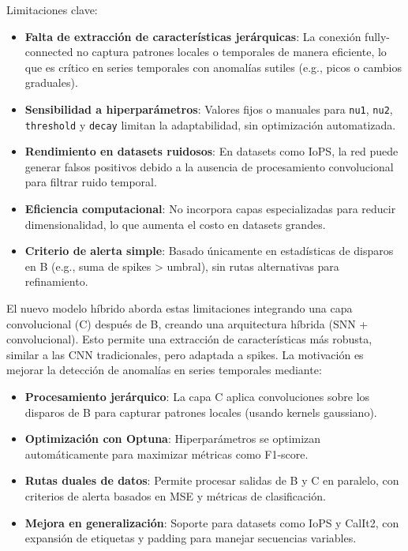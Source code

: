 Limitaciones clave:
\begin{itemize}
    \item \textbf{Falta de extracción de características jerárquicas}: La conexión fully-connected no captura patrones locales o temporales de manera eficiente, lo que es crítico en series temporales con anomalías sutiles (e.g., picos o cambios graduales).
    \item \textbf{Sensibilidad a hiperparámetros}: Valores fijos o manuales para \texttt{nu1}, \texttt{nu2}, \texttt{threshold} y \texttt{decay} limitan la adaptabilidad, sin optimización automatizada.
    \item \textbf{Rendimiento en datasets ruidosos}: En datasets como IoPS, la red puede generar falsos positivos debido a la ausencia de procesamiento convolucional para filtrar ruido temporal.
    \item \textbf{Eficiencia computacional}: No incorpora capas especializadas para reducir dimensionalidad, lo que aumenta el costo en datasets grandes.
    \item \textbf{Criterio de alerta simple}: Basado únicamente en estadísticas de disparos en B (e.g., suma de spikes > umbral), sin rutas alternativas para refinamiento.
\end{itemize}

El nuevo modelo híbrido aborda estas limitaciones integrando una capa convolucional (C) después de B, creando una arquitectura híbrida (SNN + convolucional). Esto permite una extracción de características más robusta, similar a las CNN tradicionales, pero adaptada a spikes. La motivación es mejorar la detección de anomalías en series temporales mediante:
\begin{itemize}
    \item \textbf{Procesamiento jerárquico}: La capa C aplica convoluciones sobre los disparos de B para capturar patrones locales (usando kernels gaussiano).
    \item \textbf{Optimización con Optuna}: Hiperparámetros se optimizan automáticamente para maximizar métricas como F1-score.
    \item \textbf{Rutas duales de datos}: Permite procesar salidas de B y C en paralelo, con criterios de alerta basados en MSE y métricas de clasificación.
    \item \textbf{Mejora en generalización}: Soporte para datasets como IoPS y CalIt2, con expansión de etiquetas y padding para manejar secuencias variables.
\end{itemize}

